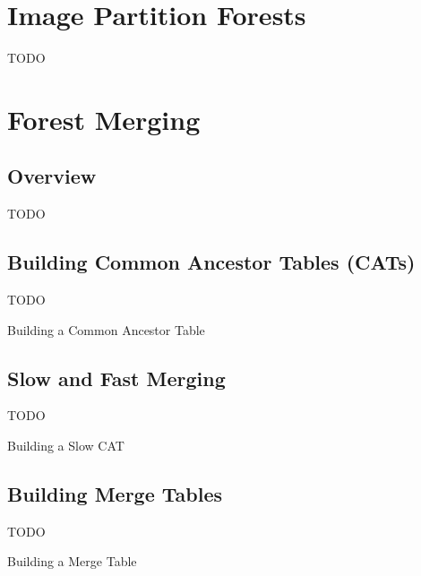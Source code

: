 \documentclass[10pt,twocolumn,twoside]{IEEEtran}
\begin{document}
\section{Image Partition Forests}
\label{sec:ipfs}

TODO

\section{Forest Merging}
\label{sec:merging}

\subsection{Overview}

TODO

\subsection{Building Common Ancestor Tables (CATs)}

TODO

\begin{stulisting}[t]
\caption{Building a Common Ancestor Table}
\label{code:build-cat}

\end{stulisting}

\subsection{Slow and Fast Merging}

TODO

\begin{stulisting}[t]
\caption{Building a Slow CAT}
\label{code:build-slow-cat}

\end{stulisting}

\subsection{Building Merge Tables}

TODO

\begin{stulisting}[t]
\caption{Building a Merge Table}
\label{code:build-merge-table}

\end{stulisting}
\end{document}
